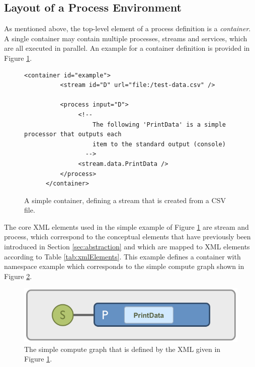 \subsection{\label{sec:processLayout}Layout of a Process Environment}
As mentioned above, the top-level element of a \streams process
definition is a {\em container}. A single container may contain
multiple processes, streams and services, which are all executed in
parallel. An example for a container definition is provided in
Figure \ref{fig:simpleContainer}.

\begin{figure}[h!]
	\begin{lstlisting}[showstringspaces=false]
      <container id="example">
          <stream id="D" url="file:/test-data.csv" />

          <process input="D">
               <!--
                   The following 'PrintData' is a simple processor that outputs each
                   item to the standard output (console)
                 -->
               <stream.data.PrintData />
          </process>
      </container>
	\end{lstlisting}
	\caption{\label{fig:simpleContainer}A simple container, defining a stream that is created from a CSV file.}
\end{figure}

The core XML elements used in the simple example of Figure
\ref{fig:simpleContainer} are {\ttfamily stream} and {\ttfamily
  process}, which correspond to the conceptual elements that have
previously been introduced in Section \ref{sec:abstraction} and
which are mapped to XML elements according to Table \ref{tab:xmlElements}.
This example defines a container with namespace {\ttfamily example}
which corresponds to the simple compute graph shown in Figure
\ref{fig:simpleGraph}.

\begin{figure}[h!]
  \centering
  \includegraphics[scale=0.3]{graphics/simple-graph}
  \caption{\label{fig:simpleGraph}The simple compute graph that is
    defined by the XML given in Figure \ref{fig:simpleContainer}.}
\end{figure}

